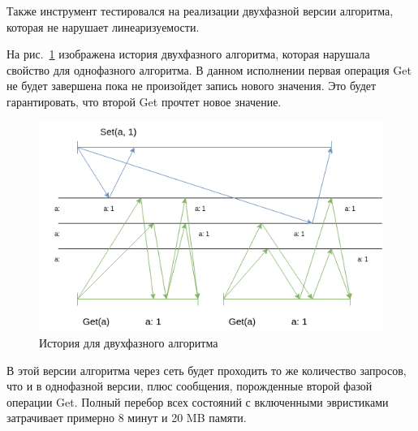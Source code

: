 Также инструмент тестировался на реализации двухфазной версии алгоритма, которая не нарушает линеаризуемости.

На рис.~\ref{fig:two_phase} изображена история двухфазного алгоритма, которая нарушала свойство для однофазного алгоритма. В данном исполнении первая операция Get не будет завершена пока не произойдет запись нового значения. Это будет гарантировать, что второй Get прочтет новое значение.

\begin{figure}[h]
    \centering
    \includegraphics[width=\textwidth]{img/two_phase.png}
    \caption{История для двухфазного алгоритма}
    \label{fig:two_phase}
\end{figure}

В этой версии алгоритма через сеть будет проходить то же количество запросов, что и в однофазной версии, плюс сообщения, порожденные второй фазой операции Get. Полный перебор всех состояний с включенными эвристиками затрачивает примерно 8 минут и 20 MB памяти.
